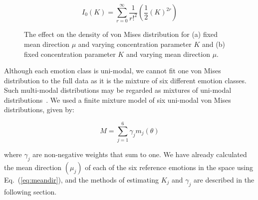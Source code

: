 \documentclass[10pt,journal,cspaper,compsoc]{IEEEtran}
\begin{document}
\begin{equation}
I_{0}(K)= \sum \limits_{r=0}^\infty \frac{1}{r!^{2}} \left(\frac{1}{2}(K)^{2r}\right)
\end{equation}

\begin{figure}[tp!]
\begin{center}
\end{center}
\caption{The effect on the density of von Mises distribution for (a) fixed mean direction $\mu$ and varying concentration parameter $K$ and (b) fixed concentration parameter $K$ and varying mean direction $\mu$.}
\label{fig_density}
\end{figure}

Although each emotion class is uni-modal, we cannot fit one von Mises distribution to the full data as it is the mixture of six different emotion classes. Such multi-modal distributions may be regarded as mixtures of uni-modal distributions~\cite{mardia1972statistics}. We used a finite mixture model of six uni-modal von Mises distributions, given by: 

\begin{equation}
M=\sum \limits_{j=1}^6 \gamma_{j}m_{j}(\theta)
\end{equation}

where $\gamma_{j}$ are non-negative weights that sum to one. We have already calculated the mean direction $(\mu_j)$ of each of the six reference emotions in the space using Eq.~(\ref{eq:meandir}), and the methods of estimating $K_{j}$ and $\gamma_{j}$ are described in the following section.
\end{document}
